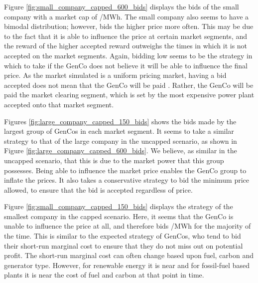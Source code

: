 Figure \ref{fig:small_company_capped_600_bids} displays the bids of the small company with a market cap of /MWh. The small company also seems to have a bimodal distribution; however, bids the higher price more often. This may be due to the fact that it is able to influence the price at certain market segments, and the reward of the higher accepted reward outweighs the times in which it is not accepted on the market segments. Again, bidding low seems to be the strategy in which to take if the GenCo does not believe it will be able to influence the final price. As the market simulated is a uniform pricing market, having a  bid accepted does not mean that the GenCo will be paid . Rather, the GenCo will be paid the market clearing segment, which is set by the most expensive power plant accepted onto that market segment.



Figures \ref{fig:large_company_capped_150_bids} shows the bids made by the largest group of GenCos in each market segment. It seems to take a similar strategy to that of the large company in the uncapped scenario, as shown in Figure \ref{fig:large_company_capped_600_bids}. We believe, as similar in the uncapped scenario, that this is due to the market power that this group possesses. Being able to influence the market price enables the GenCo group to inflate the prices. It also takes a conservative strategy to bid the minimum price allowed, to ensure that the bid is accepted regardless of price.

Figure \ref{fig:small_company_capped_150_bids} displays the strategy of the smallest company in the capped scenario. Here, it seems that the GenCo is unable to influence the price at all, and therefore bids /MWh for the majority of the time. This is similar to the expected strategy of GenCos, who tend to bid their short-run marginal cost to ensure that they do not miss out on potential profit. The short-run marginal cost can often change based upon fuel, carbon and generator type. However, for renewable energy it is near  and for fossil-fuel based plants it is near the cost of fuel and carbon at that point in time.


